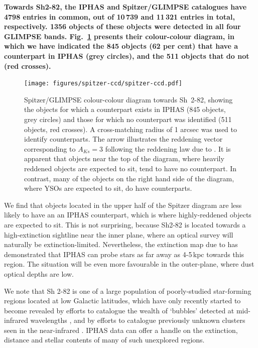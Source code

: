 \documentclass[a4paper,useAMS,usenatbib]{mn2e}
\begin{document}
{\bf Towards Sh2-82,
the IPHAS and Spitzer/GLIMPSE catalogues
have 4798 entries in common,
out of 10\,739 and 11\,321 entries in total, respectively.
1356 objects of these objects were detected in all
four GLIMPSE bands.
Fig.~\ref{fig:spitzer-ccd} presents their colour-colour diagram,
in which we have indicated the 845 objects (62 per cent)
that have a counterpart in IPHAS (grey circles),
and the 511 objects that do not (red crosses).

\begin{figure}
    \texttt{[image: figures/spitzer-ccd/spitzer-ccd.pdf]} 
    \caption{Spitzer/GLIMPSE colour-colour diagram towards Sh~2-82,
    showing the objects for which a counterpart exists in IPHAS
    (845 objects, grey circles) 
    and those for which no counterpart was identified 
    (511 objects, red crosses).
    A cross-matching radius of 1 arcsec
    was used to identify counterparts.
    The arrow illustrates the reddening vector corresponding
    to $A_{Ks}=3$ following the reddening law due to \citet{Flaherty2007}.
    It is apparent that objects near the top of the diagram,
    where heavily reddened objects are expected to sit,
    tend to have no counterpart.
    In contrast, many of the objects on the right hand side of the diagram,
    where YSOs are expected to sit, do have counterparts.
    }
    \label{fig:spitzer-ccd}
\end{figure}

We find that objects located in the upper half of the Spitzer diagram
are less likely to have an an IPHAS counterpart,
which is where highly-reddened objects are expected to sit.
This is not surprising,
because Sh2-82 is located 
towards a high-extinction sightline 
near the inner plane,
where an optical survey will naturally be extinction-limited.
Nevertheless, the extinction map due to \citet{Sale2014}
has demonstrated that IPHAS can probe stars as far away 
as 4-5\,kpc towards this region.
The situation will be even more favourable
in the outer-plane, where dust optical depths are low.

We note that Sh 2-82 is one of a large population 
of poorly-studied star-forming regions
located at low Galactic latitudes,
which have only recently started to become revealed
by efforts to catalogue the wealth of `bubbles' detected
at mid-infrared wavelengths \citep{Churchwell2006,Simpson2012},
and by efforts to catalogue previously unknown clusters seen 
in the near-infrared \cite[e.g.][]{Bica2003}.
IPHAS data can offer a handle
on the extinction, distance
and stellar contents of many of such unexplored regions.
}
\end{document}
